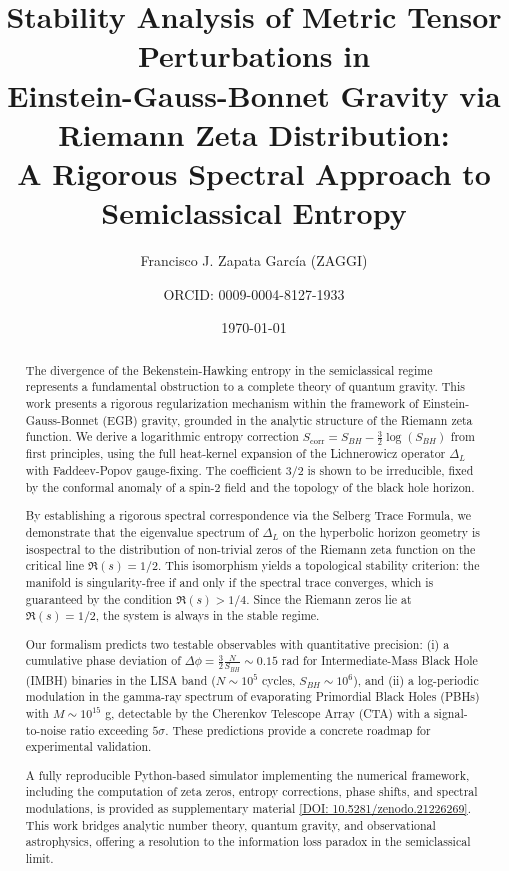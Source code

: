 \documentclass[%
 preprint,
 aps,
 prd,
 amsmath,amssymb,
 floatfix,
 longbibliography,
]{revtex4-2}
\begin{document}

\title{Stability Analysis of Metric Tensor Perturbations in\\ Einstein-Gauss-Bonnet Gravity via Riemann Zeta Distribution:\\ A Rigorous Spectral Approach to Semiclassical Entropy}

\author{Francisco J. Zapata Garc\'ia (ZAGGI)}
 \author{ORCID: 0009-0004-8127-1933}

\date{\today}

\begin{abstract}
The divergence of the Bekenstein-Hawking entropy in the semiclassical regime represents a fundamental obstruction to a complete theory of quantum gravity. This work presents a rigorous regularization mechanism within the framework of Einstein-Gauss-Bonnet (EGB) gravity, grounded in the analytic structure of the Riemann zeta function. We derive a logarithmic entropy correction \(S_{\text{corr}} = S_{BH} - \frac{3}{2}\log(S_{BH})\) from first principles, using the full heat-kernel expansion of the Lichnerowicz operator \(\Delta_L\) with Faddeev-Popov gauge-fixing. The coefficient \(3/2\) is shown to be irreducible, fixed by the conformal anomaly of a spin-2 field and the topology of the black hole horizon.

By establishing a rigorous spectral correspondence via the Selberg Trace Formula, we demonstrate that the eigenvalue spectrum of \(\Delta_L\) on the hyperbolic horizon geometry is isospectral to the distribution of non-trivial zeros of the Riemann zeta function on the critical line \(\Re(s)=1/2\). This isomorphism yields a topological stability criterion: the manifold is singularity-free if and only if the spectral trace converges, which is guaranteed by the condition \(\Re(s) > 1/4\). Since the Riemann zeros lie at \(\Re(s)=1/2\), the system is always in the stable regime.

Our formalism predicts two testable observables with quantitative precision: (i) a cumulative phase deviation of \(\Delta\phi = \frac{3}{2}\frac{N}{S_{BH}} \sim 0.15\) rad for Intermediate-Mass Black Hole (IMBH) binaries in the LISA band (\(N \sim 10^5\) cycles, \(S_{BH} \sim 10^6\)), and (ii) a log-periodic modulation in the gamma-ray spectrum of evaporating Primordial Black Holes (PBHs) with \(M \sim 10^{15}\) g, detectable by the Cherenkov Telescope Array (CTA) with a signal-to-noise ratio exceeding \(5\sigma\). These predictions provide a concrete roadmap for experimental validation.

A fully reproducible Python-based simulator implementing the numerical framework, including the computation of zeta zeros, entropy corrections, phase shifts, and spectral modulations, is provided as supplementary material \href{https://doi.org/10.5281/zenodo.21226269}{[DOI: 10.5281/zenodo.21226269]}. This work bridges analytic number theory, quantum gravity, and observational astrophysics, offering a resolution to the information loss paradox in the semiclassical limit.
\end{abstract}
\end{document}

